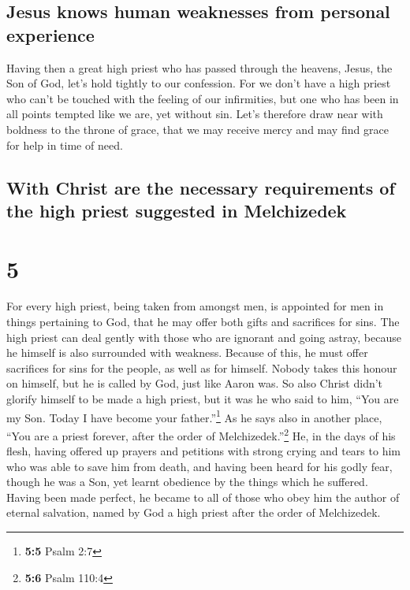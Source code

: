 \hypertarget{jesus-knows-human-weaknesses-from-personal-experience}{%
\subsection{Jesus knows human weaknesses from personal
experience}\label{jesus-knows-human-weaknesses-from-personal-experience}}

 Having then a great high priest who has passed through
the heavens, Jesus, the Son of God, let's hold tightly to our
confession.  For we don't have a high priest who can't be
touched with the feeling of our infirmities, but one who has been in all
points tempted like we are, yet without sin.  Let's
therefore draw near with boldness to the throne of grace, that we may
receive mercy and may find grace for help in time of need.

\hypertarget{with-christ-are-the-necessary-requirements-of-the-high-priest-suggested-in-melchizedek}{%
\subsection{With Christ are the necessary requirements of the high
priest suggested in
Melchizedek}\label{with-christ-are-the-necessary-requirements-of-the-high-priest-suggested-in-melchizedek}}

\hypertarget{section-4}{%
\section{5}\label{section-4}}

 For every high priest, being taken from amongst men, is
appointed for men in things pertaining to God, that he may offer both
gifts and sacrifices for sins.  The high priest can deal
gently with those who are ignorant and going astray, because he himself
is also surrounded with weakness.  Because of this, he
must offer sacrifices for sins for the people, as well as for himself.
 Nobody takes this honour on himself, but he is called by
God, just like Aaron was.  So also Christ didn't glorify
himself to be made a high priest, but it was he who said to him, ``You
are my Son. Today I have become your father.''\footnote{\textbf{5:5}
  Psalm 2:7}  As he says also in another place, ``You are
a priest forever, after the order of Melchizedek.''\footnote{\textbf{5:6}
  Psalm 110:4}  He, in the days of his flesh, having
offered up prayers and petitions with strong crying and tears to him who
was able to save him from death, and having been heard for his godly
fear,  though he was a Son, yet learnt obedience by the
things which he suffered.  Having been made perfect, he
became to all of those who obey him the author of eternal salvation,
 named by God a high priest after the order of
Melchizedek.

